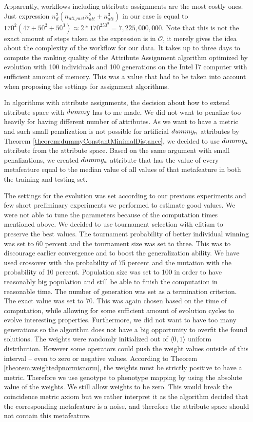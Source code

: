 Apparently, workflows including attribute assignments are the most costly ones. Just expression $n_d^2(n_{att\_met}n_{att}^2+n_{att}^3)$ in our case is equal to $170^2(47+50^2+50^3) \approx 2*170^250^3=7,225,000, 000$. Note that this is not the exact amount of steps taken as the expression is in $\mathcal{O}$, it merely gives the idea about the complexity of the workflow for our data. 
It takes up to three days to compute the ranking quality of the Attribute Assignment algorithm optimized by evolution with 100 individuals and 100 generations on the Intel I7 computer with sufficient amount of memory. This was a value that had to be taken into account when proposing the settings for assignment algorithms.

In algorithms with attribute assignments, the decision about how to extend attribute space with $dummy$ has to me made. We did not want to penalize too heavily for having different number of attributes. As we want to have a metric and such small penalization is not possible for artificial $dummy_n$ attributes by Theorem \ref{theorem:dummyConstantMinimalDistance}, we decided to use $dummy_a$ attribute from the attribute space. Based on the same argument with small penalizations, we created $dummy_a$ attribute that has the value of every metafeature equal to the median value of all values of that metafeature in both the training and testing set.

The settings for the evolution was set according to our previous experiments and few short preliminary experiments we performed to estimate good values. We were not able to tune the parameters because of the computation times mentioned above. We decided to use tournament selection with elitism to preserve the best values. The tournament probability of better individual winning was set to 60 percent and the tournament size was set to three. This was to discourage earlier convergence and to boost the generalization ability. We have used crossover with the probability of 75 percent and the mutation with the probability of 10 percent. Population size was set to 100 in order to have reasonably big population and still be able to finish the computation in reasonable time. The number of generation was set as a termination criterion. The exact value was set to 70. This was again chosen based on the time of computation, while allowing for some sufficient amount of evolution cycles to evolve interesting properties. Furthermore, we did not want to have too many generations so the algorithm does not have a big opportunity to overfit the found solutions. The weights were randomly initialized out of $\langle 0,1 \rangle$ uniform distribution. However some operators could push the weight values outside of this interval -- even to zero or negative values. According to Theorem \ref{theorem:weightedpnormisnorm}, the weights must be strictly positive to have a metric. Therefore we use genotype to phenotype mapping by using the absolute value of the weights. We still allow weights to be zero. This would break the coincidence metric axiom but we rather interpret it as the algorithm decided that the corresponding metafeature is a noise, and therefore the attribute space should not contain this metafeature.

